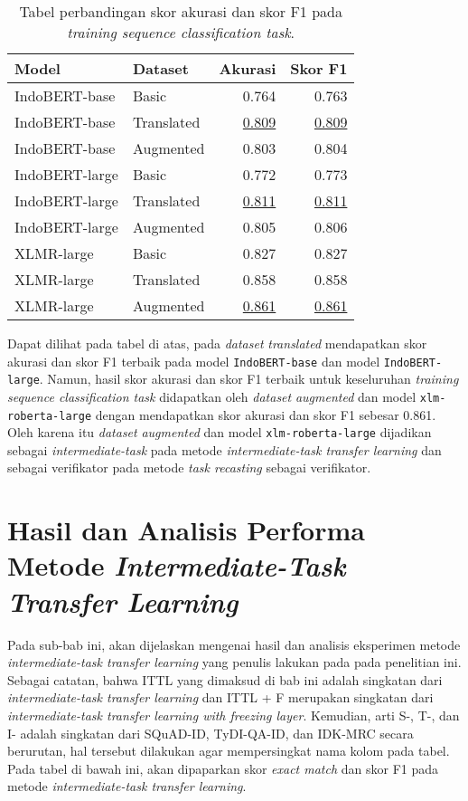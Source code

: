 \begin{table}[H]\centering
\begin{tabular}{llrr}
\toprule
         Model &    Dataset &  Akurasi &  Skor F1 \\
\midrule
 IndoBERT-base &      Basic &    0.764 &    0.763 \\
 IndoBERT-base & Translated &    \underline{0.809} &    \underline{0.809} \\
 IndoBERT-base &  Augmented &    0.803 &    0.804 \\
\hline
IndoBERT-large &      Basic &    0.772 &    0.773 \\
IndoBERT-large & Translated &    \underline{0.811} &    \underline{0.811} \\
IndoBERT-large &  Augmented &    0.805 &    0.806 \\
\hline
    XLMR-large &      Basic &    0.827 &    0.827 \\
    XLMR-large & Translated &    0.858 &    0.858 \\
    XLMR-large &  Augmented &    \underline{0.861} &    \underline{0.861} \\
\bottomrule
\end{tabular}
\caption{Tabel perbandingan skor akurasi dan skor F1 pada \emph{training sequence classification task}.}
\end{table}

Dapat dilihat pada tabel di atas, pada \emph{dataset} \emph{translated} mendapatkan skor akurasi dan skor F1 terbaik pada model \texttt{IndoBERT-base} dan model \texttt{IndoBERT-large}. Namun, hasil skor akurasi dan skor F1 terbaik untuk keseluruhan \emph{training sequence classification task} didapatkan oleh \emph{dataset} \emph{augmented} dan model \texttt{xlm-roberta-large} dengan mendapatkan skor akurasi dan skor F1 sebesar 0.861. Oleh karena itu \emph{dataset} \emph{augmented} dan model \texttt{xlm-roberta-large} dijadikan sebagai \emph{intermediate-task} pada metode \emph{intermediate-task transfer learning} dan sebagai verifikator pada metode \emph{task recasting} sebagai verifikator.

\section{Hasil dan Analisis Performa Metode \emph{Intermediate-Task Transfer Learning}}
\label{5.3}
Pada sub-bab ini, akan dijelaskan mengenai hasil dan analisis eksperimen metode \emph{intermediate-task transfer learning} yang penulis lakukan pada pada penelitian ini. Sebagai catatan, bahwa ITTL yang dimaksud di bab ini adalah singkatan dari \emph{intermediate-task transfer learning} dan ITTL + F merupakan singkatan dari \emph{intermediate-task transfer learning with freezing layer}. Kemudian, arti S-, T-, dan I- adalah singkatan dari SQuAD-ID, TyDI-QA-ID, dan IDK-MRC secara berurutan, hal tersebut dilakukan agar mempersingkat nama kolom pada tabel. Pada tabel di bawah ini, akan dipaparkan skor \emph{exact match} dan skor F1 pada metode \emph{intermediate-task transfer learning}.


